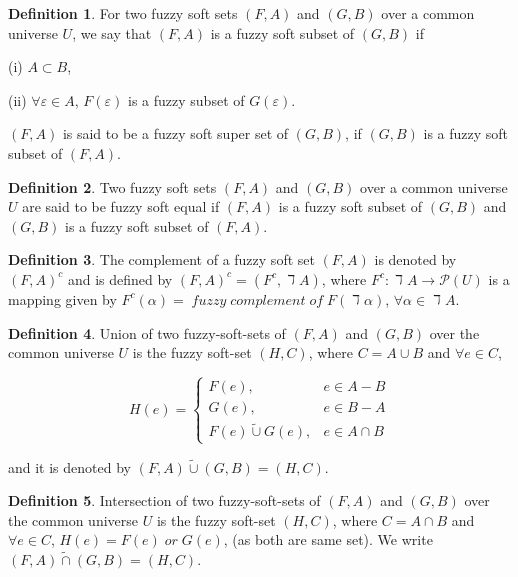 \documentclass{article}
\theoremstyle{definition}
\newtheorem{definition}{Definition}[section]
\begin{document}
\begin{definition}\cite{7}
    For two fuzzy soft sets $(F, A)$ and $(G, B)$ over a common universe $U$, we say that $(F, A)$ is a fuzzy soft subset of $(G, B)$ if 

    (i) $A\subset B$,
    
    (ii) $\forall \varepsilon \in A$, $F(\varepsilon)$ is a fuzzy subset of $G(\varepsilon)$.

    $(F, A)$ is said to be a fuzzy soft super set of $(G, B)$, if $(G, B)$ is a fuzzy soft subset of $(F, A)$. \\
\end{definition}

\begin{definition}\cite{7}
    Two fuzzy soft sets $(F, A)$ and $(G, B)$ over a common universe $U$ are said to be fuzzy soft equal if $(F, A)$ is a fuzzy soft subset of $(G, B)$ and $(G, B)$ is a fuzzy soft subset of $(F, A)$.\\
\end{definition}

\begin{definition}\cite{7}
    The complement of a fuzzy soft set $(F, A)$ is denoted by $(F, A)^c$ and is defined by $(F, A)^c=(F^c, \daleth A)$, where $F^c : \daleth A \to \mathcal{P}(U)$ is a mapping given by $F^c(\alpha)= \;fuzzy \;complement\; of\; F(\daleth\alpha)$, $\forall\alpha \in \daleth A$.\\
\end{definition}

\begin{definition}\cite{7}
Union of two fuzzy-soft-sets of $(F, A)$ and $(G, B)$ over the common universe $U$ is the fuzzy soft-set $(H, C)$, where $C=A\cup B$ and $\forall e\in C$,


    \[H(e)=\begin{cases}
        F(e), & e\in A-B\\
        G(e), & e\in B-A\\
        F(e) \tilde{\cup} G(e), & e\in A\cap B
    \end{cases}
    \]

    and it is denoted by $(F, A) \tilde{\cup} (G, B)=(H, C)$.\\
\end{definition}

\begin{definition}\cite{7}
    Intersection of two fuzzy-soft-sets of $(F, A)$ and $(G, B)$ over the common universe $U$ is the fuzzy soft-set $(H, C)$, where $C=A\cap B$ and $\forall e\in C$, $H(e)=F(e) \;or\; G(e)$, (as both are same set). We write $(F, A) \tilde{\cap} (G, B)=(H, C)$.\\
\end{definition}
\end{document}
